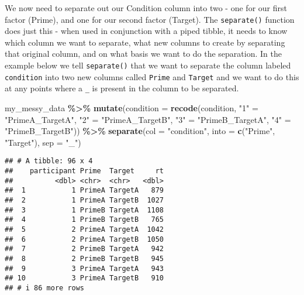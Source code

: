 \documentclass[
]{book}
\newenvironment{Shaded}{\begin{snugshade}}{\end{snugshade}}
\newcommand{\AttributeTok}[1]{\textcolor[rgb]{0.13,0.29,0.53}{#1}}
\newcommand{\FunctionTok}[1]{\textcolor[rgb]{0.13,0.29,0.53}{\textbf{#1}}}
\newcommand{\NormalTok}[1]{#1}
\newcommand{\OtherTok}[1]{\textcolor[rgb]{0.56,0.35,0.01}{#1}}
\newcommand{\SpecialCharTok}[1]{\textcolor[rgb]{0.81,0.36,0.00}{\textbf{#1}}}
\newcommand{\StringTok}[1]{\textcolor[rgb]{0.31,0.60,0.02}{#1}}
\begin{document}
We now need to separate out our Condition column into two - one for our first factor (Prime), and one for our second factor (Target). The \texttt{separate()} function does just this - when used in conjunction with a piped tibble, it needs to know which column we want to separate, what new columns to create by separating that original column, and on what basis we want to do the separation. In the example below we tell \texttt{separate()} that we want to separate the column labeled \texttt{condition} into two new columns called \texttt{Prime} and \texttt{Target} and we want to do this at any points where a \texttt{\_} is present in the column to be separated.

\begin{Shaded}
\begin{Highlighting}[]
\NormalTok{my\_messy\_data }\SpecialCharTok{\%\textgreater{}\%} 
  \FunctionTok{mutate}\NormalTok{(}\AttributeTok{condition =} \FunctionTok{recode}\NormalTok{(condition,}
                            \StringTok{"1"} \OtherTok{=} \StringTok{"PrimeA\_TargetA"}\NormalTok{,}
                            \StringTok{"2"} \OtherTok{=} \StringTok{"PrimeA\_TargetB"}\NormalTok{, }
                            \StringTok{"3"} \OtherTok{=} \StringTok{"PrimeB\_TargetA"}\NormalTok{, }
                            \StringTok{"4"} \OtherTok{=} \StringTok{"PrimeB\_TargetB"}\NormalTok{)) }\SpecialCharTok{\%\textgreater{}\%}
  \FunctionTok{separate}\NormalTok{(}\AttributeTok{col =} \StringTok{"condition"}\NormalTok{, }\AttributeTok{into =} \FunctionTok{c}\NormalTok{(}\StringTok{"Prime"}\NormalTok{, }\StringTok{"Target"}\NormalTok{), }\AttributeTok{sep =} \StringTok{"\_"}\NormalTok{)}
\end{Highlighting}
\end{Shaded}

\begin{verbatim}
## # A tibble: 96 x 4
##    participant Prime  Target     rt
##          <dbl> <chr>  <chr>   <dbl>
##  1           1 PrimeA TargetA   879
##  2           1 PrimeA TargetB  1027
##  3           1 PrimeB TargetA  1108
##  4           1 PrimeB TargetB   765
##  5           2 PrimeA TargetA  1042
##  6           2 PrimeA TargetB  1050
##  7           2 PrimeB TargetA   942
##  8           2 PrimeB TargetB   945
##  9           3 PrimeA TargetA   943
## 10           3 PrimeA TargetB   910
## # i 86 more rows
\end{verbatim}
\end{document}
